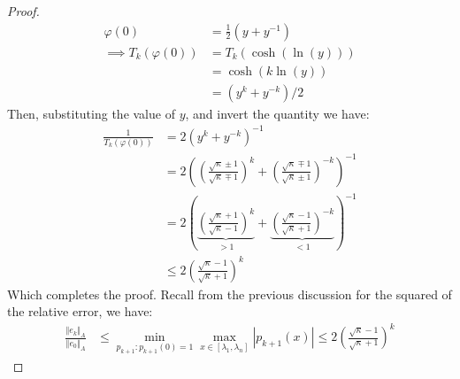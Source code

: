 \documentclass[]{article}
\theoremstyle{definition}
\begin{document}
\begin{proof}
                \begin{align}
                    \varphi(0)&= \frac{1}{2}(y + y^{-1})
                    \\
                    \implies 
                    T_k(\varphi(0)) &= 
                    T_k(\cosh(\ln(y)))
                    \\
                    &= \cosh(k\ln(y))
                    \\
                    &= (y^k + y^{-k})/2
                \end{align}
                Then, substituting the value of $y$, and invert the quantity we have: 
                \begin{align}
                    \frac{1}{T_k(\varphi(0))} &= 2(y^k + y^{-k})^{-1}
                    \\
                    &= 
                    2\left(
                        \left(
                            \frac{\sqrt{\kappa}\pm 1}{\sqrt{\kappa}\mp 1}
                        \right)^{k} + 
                        \left(
                            \frac{\sqrt{\kappa}\mp 1}{\sqrt{\kappa}\pm 1}
                        \right)^{-k}
                    \right)^{-1}
                    \\
                    &= 2\left(
                        \underbrace{\left(
                            \frac{\sqrt{\kappa}+ 1}{\sqrt{\kappa}- 1}
                        \right)^{k}}_{> 1} + 
                        \underbrace{\left(
                            \frac{\sqrt{\kappa}- 1}{\sqrt{\kappa}+ 1}
                        \right)^{-k}}_{ < 1}
                    \right)^{-1}
                    \\
                    & \le 2 \left(
                        \frac{\sqrt{\kappa} - 1}{\sqrt{\kappa} + 1}
                    \right)^k
                \end{align}
                Which completes the proof. Recall from the previous discussion for the squared of the relative error, we have: 
                \begin{align}
                    \frac{\Vert e_k\Vert_A}{\Vert e_0\Vert_A} &\le 
                    \min_{p_{k + 1}: p_{k + 1}(0) = 1}\max_{x\in [\lambda_{1}, \lambda_{n}]} |p_{k + 1}(x)| \le 
                    2 \left(
                        \frac{\sqrt{\kappa} - 1}{\sqrt{\kappa} + 1}
                    \right)^k
                \end{align}

            \end{proof}
\end{document}
